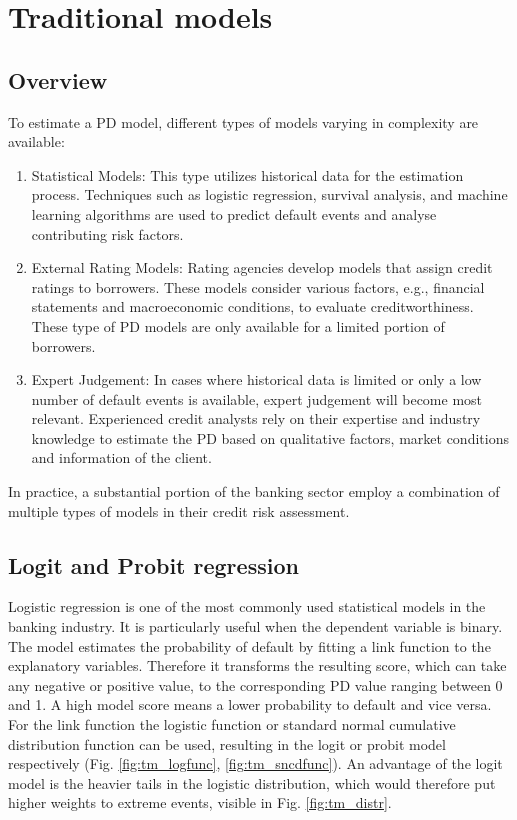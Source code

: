 \chapter{Traditional models}

\section{Overview}
To estimate a PD model, different types of models varying in complexity are available:

\begin{enumerate}
  \item Statistical Models: This type utilizes historical data for the estimation process. Techniques such as logistic regression, survival analysis, and machine learning algorithms are used to predict default events and analyse contributing risk factors.
  \item External Rating Models: Rating agencies develop models that assign credit ratings to borrowers. These models consider various factors, e.g., financial statements and macroeconomic conditions, to evaluate creditworthiness. These type of PD models are only available for a limited portion of borrowers. 
  \item Expert Judgement: In cases where historical data is limited or only a low number of default events is available, expert judgement will become most relevant. Experienced credit analysts rely on their expertise and industry knowledge to estimate the PD based on qualitative factors, market conditions and information of the client.
\end{enumerate}

In practice, a substantial portion of the banking sector employ a combination of multiple types of models in their credit risk assessment.

\section{Logit and Probit regression}
Logistic regression is one of the most commonly used statistical models in the banking industry. It is particularly useful when the dependent variable is binary. The model estimates the probability of default by fitting a link function to the explanatory variables. Therefore it transforms the resulting score, which can take any negative or positive value, to the corresponding PD value ranging between 0 and 1. A high model score means a lower probability to default and vice versa. For the link function the logistic function or standard normal cumulative distribution function can be used, resulting in the logit or probit model respectively (Fig. \ref{fig:tm_logfunc}, \ref{fig:tm_sncdfunc}). An advantage of the logit model is the heavier tails in the logistic distribution, which would therefore put higher weights to extreme events, visible in Fig. \ref{fig:tm_distr}. 

